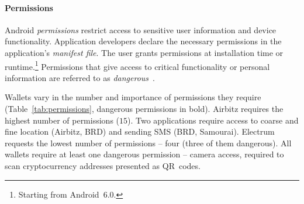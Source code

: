 \paragraph{Permissions}
Android \textit{permissions} restrict access to sensitive user information and device functionality.
Application developers declare the necessary permissions in the application's \textit{manifest file}.
The user grants permissions at installation time or runtime.\footnote{Starting from Android~6.0.}
Permissions that give access to critical functionality or personal information are referred to as \textit{dangerous}~\cite{Android}.

Wallets vary in the number and importance of permissions they require (Table~\ref{tab:permissions}, dangerous permissions in bold).
Airbitz requires the highest number of permissions ($15$).
Two applications require access to coarse and fine location (Airbitz, BRD) and sending SMS (BRD, Samourai).
Electrum requests the lowest number of permissions -- four (three of them dangerous).
All wallets require at least one dangerous permission -- camera access, required to scan cryptocurrency addresses presented as QR~codes.

